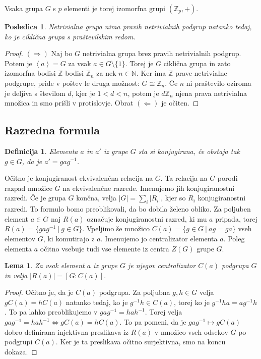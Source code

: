 \documentclass[10pt, a4paper]{article}
\newtheorem{posledica}[izr]{Posledica}
\newtheorem{defi}{Definicija}[section]
\newenvironment{noticeB}{%
  \tcolorbox[%
  notitle,
  empty,
  enhanced,  %
  breakable,
  coltext=black,
  colback=white, 
  fontupper=\rmfamily,
  noparskip,
  sharp corners,
  boxrule=-1pt,  %
  frame hidden,
  left=7pt,  %
  right=7pt,
  top=5pt,
  bottom=5pt,
  before skip=2.5ex plus 2pt,
  after skip=2.5ex plus 2pt,
  borderline west = {1.5pt}{-0.1pt}{blue!30!black}, %
  overlay unbroken and last={%
    \draw[color=black, line width=1.25pt]
    ($(frame.south west)+(1.pt, -0.1pt)$) -- ++(2em, 0);
  }
  ]}
{\endtcolorbox}
\newenvironment{definicija}{\begin{noticeB}\begin{defi}}{%
    \end{defi}\end{noticeB}}
\newtheorem{lema}[izr]{Lema}
\newenvironment{noticeC}{%
  \tcolorbox[%
  notitle,
  empty,
  enhanced,  %
  breakable,
  coltext=black, 
  fontupper=\rmfamily,
  noparskip,
  sharp corners,
  boxrule=-1pt,  %
  frame hidden,
  left=7pt,  %
  right=7pt,
  top=5pt,
  bottom=5pt,
  before skip=2.5ex plus 2pt,
  after skip=2.5ex plus 2pt,
  overlay unbroken and last={%
  },
  ]}
{\endtcolorbox}
\newenvironment{dokaz}%
  {\begin{noticeC}\begin{proof}}%
  {\end{proof}\end{noticeC}}
\newcommand{\N}{\mathbb {N}}
\newcommand{\Z}{\mathbb {Z}}
\newcommand{\gen}[1]{\left\langle #1 \right\rangle}
\begin{document}
Vsaka grupa $G$ s $p$ elementi je torej izomorfna grupi $(\Z_p, +)$.

\begin{posledica}
  Netrivialna grupa nima pravih netrivialnih podgrup natanko tedaj, ko je ciklična grupa s praštevilskim redom.
\end{posledica}

\begin{dokaz}
  $(\Rightarrow)$ Naj bo $G$ netrivialna grupa brez pravih netrivialnih podgrup.
  Potem je $\gen{a} = G$ za vsak $a \in G \setminus \{1\}$.
  Torej je $G$ ciklična grupa in zato izomorfna bodisi $\Z$ bodisi $\Z_n$ za nek $n \in \N$.
  Ker ima $\Z$ prave netrivialne podgrupe, pride v poštev le druga možnost: $G \cong \Z_n$.
  Če $n$ ni praštevilo oziroma je deljiva s številom $d$, kjer je $1 < d < n$, 
  potem je $d\Z_n$ njena prava netrivialna množica in smo prišli v protislovje.
  Obrat $(\Leftarrow)$ je očiten.
\end{dokaz}


\subsection{Razredna formula}

\begin{definicija}
  Elementa $a$ in $a'$ iz grupe $G$ sta si konjugirana,
  če obstaja tak $g \in G$, da je $a' = g ag^{-1}$.
\end{definicija}

Očitno je konjugiranost ekvivalenčna relacija na $G$.
Ta relacija na $G$ porodi razpad množice $G$ na ekvivalenčne razrede.
Imenujemo jih konjugiranostni razredi.
Če je grupa $G$ končna, velja $|G| = \sum_i |R_i|$,
kjer so $R_i$ konjugiranostni razredi.
To formulo bomo preoblikovali, da bo dobila želeno obliko.
Za poljuben element $a \in G$ naj $R(a)$ označuje konjugiranostni razred, ki mu $a$ pripada,
torej $R(a) = \{gag^{-1}\ |\ g \in G\}$.
Vpeljimo še množico $C(a) = \{g \in G\ |\ ag = ga\}$ vseh elementov $G$, ki komutirajo z $a$.
Imenujemo jo centralizator elementa $a$.
Poleg elementa $a$ očitno vsebuje tudi vse elemente iz centra $Z(G)$ grupe $G$.

\begin{lema}
  Za vsak element $a$ iz grupe $G$ je njegov centralizator $C(a)$ podgrupa $G$
  in velja $|R(a)| = [G: C(a)]$.
\end{lema}

\begin{dokaz}
  Očitno je, da je $C(a)$ podgrupa.
  Za poljubna $g, h \in G$ velja $gC(a) = hC(a)$ natanko tedaj, ko je 
  $g^{-1} h \in C(a)$, torej ko je $g^{-1} h a = a g^{-1} h$.
  To pa lahko preoblikujemo v $g ag^{-1} = h a h^{-1}$.
  Torej velja $gag^{-1} = h a h^{-1} \Leftrightarrow g C(a) = h C(a)$.
  To pa pomeni, da je $g a g^{-1} \mapsto gC(a)$ dobro definirana injektivna preslikava 
  iz $R(a)$ v množico vseh odsekov $G$ po podgrupi $C(a)$.
  Ker je ta preslikava očitno surjektivna, smo na koncu dokaza.
\end{dokaz}
\end{document}
